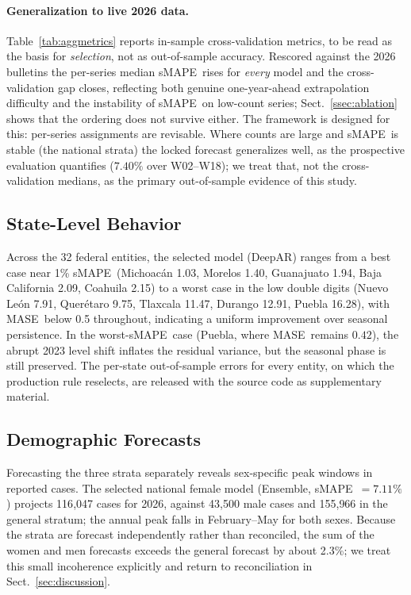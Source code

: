 \documentclass[runningheads]{llncs}
\newcommand{\smape}{sMAPE}
\newcommand{\mase}{MASE}
\begin{document}
\paragraph{Generalization to live 2026 data.}
Table~\ref{tab:aggmetrics} reports in-sample cross-validation metrics,
to be read as the basis for \emph{selection}, not as out-of-sample
accuracy. Rescored against the 2026 bulletins the per-series median
\smape\ rises for \emph{every} model and the cross-validation gap
closes, reflecting both genuine one-year-ahead extrapolation difficulty
and the instability of \smape\ on low-count series;
Sect.~\ref{ssec:ablation} shows that the ordering does not survive
either. The framework is designed for this: per-series assignments are
revisable. Where counts are large
and \smape\ is stable (the national strata) the locked forecast
generalizes well, as the prospective evaluation quantifies ($7.40\%$
over W02--W18); we treat that, not the cross-validation medians, as
the primary out-of-sample evidence of this study.

\subsection{State-Level Behavior}

Across the 32 federal entities, the selected model (DeepAR) ranges from
a best case near 1\% \smape\ (Michoac\'an 1.03, Morelos 1.40,
Guanajuato 1.94, Baja California 2.09, Coahuila 2.15) to a worst case
in the low double digits (Nuevo Le\'on 7.91, Quer\'etaro 9.75, Tlaxcala
11.47, Durango 12.91, Puebla 16.28), with \mase\ below 0.5 throughout,
indicating a uniform improvement over seasonal persistence. In the
worst-\smape\ case (Puebla, where \mase\ remains $0.42$), the abrupt 2023 level shift
inflates the residual variance, but the seasonal phase is still
preserved. The
per-state out-of-sample errors for every entity, on which the
production rule reselects, are released with the source code as
supplementary material.

\subsection{Demographic Forecasts}
\label{ssec:demoforecasts}

Forecasting the three strata separately reveals sex-specific
peak windows in reported cases. The selected national female model (Ensemble,
\smape\ $=7.11\%$) projects 116{,}047 cases for 2026, against 43{,}500
male cases and 155{,}966 in the general stratum; the annual peak falls
in February--May for both sexes. Because the strata are forecast
independently rather than reconciled, the sum of the women and men
forecasts exceeds the general forecast by about 2.3\%; we treat this small incoherence
explicitly and return to reconciliation in
Sect.~\ref{sec:discussion}.
\end{document}
